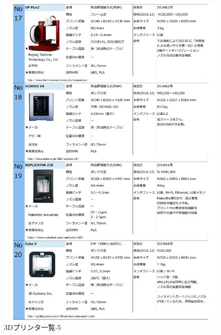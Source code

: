 \begin{figure}[htbp]
\centering
\includegraphics[width=380pt]{fig/fig28_cmyk.jpg}
\caption{3Dプリンタ一覧-5}
\label{fig28}
\end{figure}

